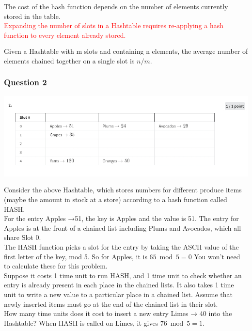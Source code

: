 \documentclass{article}
\begin{document}
The cost of the hash function depends on the number of elements currently stored in the table.\\


\textcolor{red}{Expanding the number of slots in a Hashtable requires re-applying a hash function to every element already stored.\\}

Given a Hashtable with m slots and containing n elements, the average number of elements chained together on a single slot is $n/m$.\\


\subsubsection{Question 2}

\includegraphics[width=\textwidth]{hashtablequestion2.png}

Consider the above Hashtable, which stores numbers for different produce items (maybe the amount in stock at a store) according to a hash function called HASH.\\

For the entry Apples →51, the key is Apples and the value is 51.  
The entry for Apples is at the front of a chained list including Plums and Avocados, which all share Slot 0.\\

The HASH function picks a slot for the entry by taking the ASCII value of the first letter of the key, mod 5. So for Apples, it is 
$65\bmod5=0$ You won't need to calculate these for this problem.\\

Suppose it costs 1 time unit to run HASH, and 1 time unit to check whether an entry is already present in each place in the chained lists.  
It also takes 1 time unit to write a new value to a particular place in a chained list.  
Assume that newly inserted items must go at the end of the chained list in their slot.\\


How many time units does it cost to insert a new entry Limes → 40 into the Hashtable?  When HASH is called on Limes, it gives $76 \bmod 5 = 1$.\\
\end{document}
